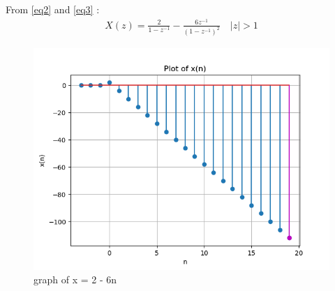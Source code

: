 \documentclass[journal,12pt,twocolumn]{IEEEtran}
\theoremstyle{remark}
\begin{document}
From \eqref{eq2} and \eqref{eq3} :
    \begin{align}
        X(z)=\frac{2}{1-z^{-1}} - \frac{6z^{-1}}{(1-z^{-1})^{2}} \quad |z|>1
    \end{align}

    \begin{figure}[h]
    \renewcommand\thefigure{1}
        \centering
        \includegraphics[width=1\linewidth]{figs/Figure_1.png}
        \caption{graph of x = 2 - 6n}
    \end{figure}
\end{document}

